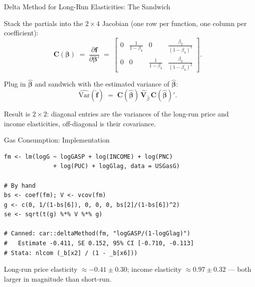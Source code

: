 \documentclass[aspectratio=169, handout, t]{beamer}
\providecommand{\Var}{\mathrm{Var}}
\numberwithin{equation}{section}
\begin{document}

\begin{frame}{Delta Method for Long-Run Elasticities: The Sandwich}

Stack the partials into the $2 \times 4$ Jacobian (one row per function, one column per coefficient):
\[
\bm{C}(\bm{\beta}) \;=\; \frac{\partial \bm f}{\partial \bm{\beta}'} \;=\;
\begin{bmatrix}
0 & \tfrac{1}{1-\beta_4} & 0 & \tfrac{\beta_2}{(1-\beta_4)^2} \\[2pt]
0 & 0 & \tfrac{1}{1-\beta_4} & \tfrac{\beta_3}{(1-\beta_4)^2}
\end{bmatrix}.
\]

\pause

\medskip

Plug in $\hat{\bm{\beta}}$ and sandwich with the estimated variance of $\hat{\bm{\beta}}$:
\[
\widehat{\Var}(\hat{\bm f}) \;=\; \bm{C}(\hat{\bm{\beta}})\,\hat{\bm{V}}_{\hat{\beta}}\,\bm{C}(\hat{\bm{\beta}})'.
\]

\pause

\medskip

Result is $2 \times 2$: diagonal entries are the variances of the long-run price and income elasticities, off-diagonal is their covariance.

\end{frame}


\begin{frame}[fragile]{Gas Consumption: Implementation}

\begin{lstlisting}
fm <- lm(logG ~ logGASP + log(INCOME) + log(PNC)
              + log(PUC) + logGlag, data = USGasG)

# By hand
bs <- coef(fm); V <- vcov(fm)
g <- c(0, 1/(1-bs[6]), 0, 0, 0, bs[2]/(1-bs[6])^2)
se <- sqrt(t(g) %*% V %*% g)

# Canned: car::deltaMethod(fm, "logGASP/(1-logGlag)")
#   Estimate -0.411, SE 0.152, 95% CI [-0.710, -0.113]
# Stata: nlcom (_b[x2] / (1 - _b[x6]))
\end{lstlisting}

Long-run price elasticity $\approx -0.41 \pm 0.30$; income elasticity $\approx 0.97 \pm 0.32$ --- both larger in magnitude than short-run.

\end{frame}
\end{document}
